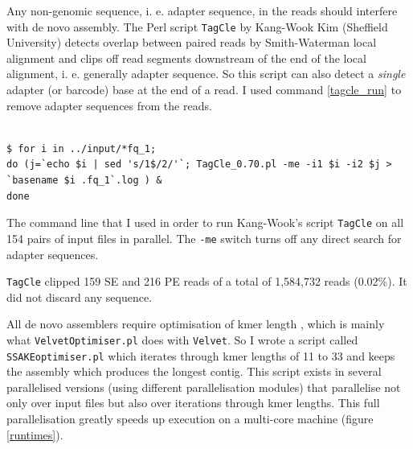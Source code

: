 \documentclass[a4paper,12pt,times,print,index,custombib,custommargin]{PhDThesisPSnPDF}\usepackage[]{graphicx}\usepackage[]{color}
\begin{document}
Any non-genomic sequence, i. e. adapter sequence, in the reads should interfere with de novo assembly. The Perl script \texttt{TagCle} by Kang-Wook Kim (Sheffield University) detects overlap between paired reads by Smith-Waterman local alignment and clips off read segments downstream of the end of the local alignment, i. e. generally adapter sequence. So this script can also detect a \emph{single} adapter (or barcode) base at the end of a read. I used command \ref{tagcle_run} to remove adapter sequences from the reads.

\begin{cmd}
\captionsetup{type=cmd} %
\begin{Verbatim}[fontsize=\scriptsize, formatcom=\color{darkgray}]

$ for i in ../input/*fq_1; 
do (j=`echo $i | sed 's/1$/2/'`; TagCle_0.70.pl -me -i1 $i -i2 $j > `basename $i .fq_1`.log ) & 
done
\end{Verbatim}
\caption{The command line that I used in order to run Kang-Wook's script \texttt{TagCle} on all 154 pairs of input files in parallel. The \texttt{-me} switch turns off any direct search for adapter sequences.}
\label{tagcle_run}
\end{cmd}

\texttt{TagCle} clipped 159 SE and 216 PE reads of a total of 1,584,732 reads (0.02\%). It did not discard any sequence.

All de novo assemblers require optimisation of \gls{kmer} length \citep{Davey2012}, which is mainly what \texttt{VelvetOptimiser.pl} does with \texttt{Velvet}. So I wrote a script called \texttt{SSAKEoptimiser.pl} which iterates through \gls{kmer} lengths of 11 to 33 and keeps the assembly which produces the longest contig. This script exists in several parallelised versions (using different parallelisation modules) that parallelise not only over input files but also over iterations through \gls{kmer} lengths. This full parallelisation greatly speeds up execution on a multi-core machine (figure \ref{runtimes}).
\end{document}

